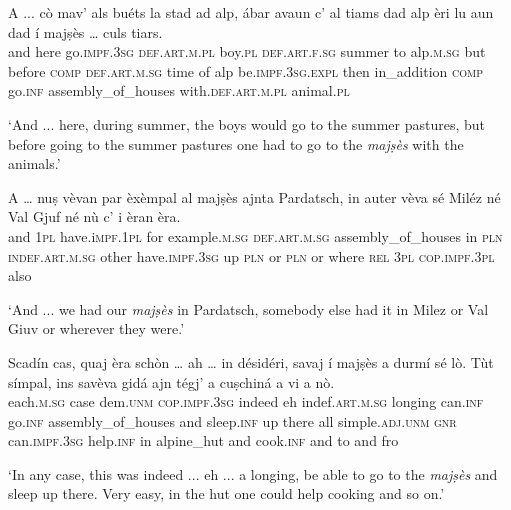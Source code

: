 \begin{linenumbers}
	\gll  A ... cò mav’ als buéts la stad ad alp, ábar avaun c’ al tiams dad alp èri lu aun dad í majṣès … culs tiars.  \\
and {} here go.\textsc{impf.3sg} \textsc{def.art.m.pl} boy.\textsc{pl} \textsc{def.art.f.sg} summer to alp.\textsc{m.sg} but before \textsc{comp} \textsc{def.art.m.sg} time of alp be.\textsc{impf.3sg.expl} then in\_addition \textsc{comp} go.\textsc{inf} assembly\_of\_houses {} with.\textsc{def.art.m.pl} animal.\textsc{pl}\\
\end{linenumbers}
\medskip
\glt `And ... here, during summer, the boys would go to the summer pastures, but before going to the summer pastures one had to go to the \textit{majṣès} with the animals.'
\medskip

\begin{linenumbers}
	\gll A … nuṣ vèvan par èxèmpal al majṣès ajnta Pardatsch, in auter vèva sé Miléz né Val Gjuf né nù c’ i èran èra.\\
	and {} \textsc{1pl} have.i\textsc{mpf.1pl} for example.\textsc{m.sg} \textsc{def.art.m.sg}  assembly\_of\_houses in \textsc{pln}  \textsc{indef.art.m.sg} other have.\textsc{impf.3sg} up \textsc{pln} or \textsc{pln} {} or where \textsc{rel} \textsc{3pl} \textsc{cop.impf.3pl} also \\
\end{linenumbers}
\medskip
\glt `And ... we had our \textit{majṣès} in Pardatsch, somebody else had it in Milez or Val Giuv or wherever they were.'
\medskip

\begin{linenumbers}
	\gll Scadín cas, quaj èra schòn … ah … in désidéri, savaj í majṣès a durmí sé lò. Tùt símpal, ins savèva gidá ajn tégj’ a cuṣchiná a vi a nò.\\
	each.\textsc{m.sg} case dem.\textsc{unm} \textsc{cop.impf.3sg} indeed {} eh {} indef.\textsc{art.m.sg} longing can.\textsc{inf} go.\textsc{inf} assembly\_of\_houses and sleep.\textsc{inf} up there all simple.\textsc{adj.unm} \textsc{gnr} can.\textsc{impf.3sg} help.\textsc{inf} in alpine\_hut and cook.\textsc{inf} and to and fro\\
\end{linenumbers}
\medskip
\glt `In any case, this was indeed ... eh ... a longing, be able to go to the \textit{majṣès} and sleep up there. Very easy, in the hut one could help cooking and so on.'
\medskip

